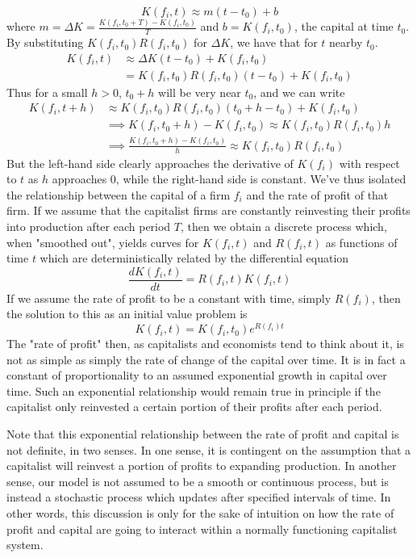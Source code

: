 \documentclass{article}
\theoremstyle{definition}
\theoremstyle{plain}
\theoremstyle{theorem}
\begin{document}
\[ K(f_i,t) \approx m(t-t_0)+b \]
where $m = \Delta K = \frac{K(f_i,t_0+T)-K(f_i,t_0)}{T}$ and $b = K(f_i,t_0)$, the capital at time $t_0$. By substituting $K(f_i,t_0)R(f_i,t_0)$ for $\Delta K$, we have that for $t$ nearby $t_0$.
\begin{align}
 	K(f_i,t) &\approx \Delta K(t-t_0)+K(f_i,t_0) \\
 			&= K(f_i,t_0)R(f_i,t_0)(t-t_0) + K(f_i,t_0)  
\end{align}
Thus for a small $h>0$, $t_0+h$ will be very near $t_0$, and we can write
\begin{align}
	K(f_i,t+h) &\approx K(f_i,t_0)R(f_i,t_0)(t_0+h-t_0) + K(f_i,t_0) \\
	&\implies K(f_i,t_0+h)-K(f_i,t_0) \approx K(f_i,t_0)R(f_i,t_0)h \\
	&\implies \frac{K(f_i,t_0+h)-K(f_i,t_0)}{h} \approx K(f_i,t_0)R(f_i,t_0)
\end{align}
But the left-hand side clearly approaches the derivative of $K(f_i)$ with respect to $t$ as $h$ approaches $0$, while the right-hand side is constant. We've thus isolated the relationship between the capital of a firm $f_i$ and the rate of profit of that firm. If we assume that the capitalist firms are constantly reinvesting their profits into production after each period $T$, then we obtain a discrete process which, when "smoothed out", yields curves for $K(f_i,t)$ and $R(f_i,t)$ as functions of time $t$ which are deterministically related by the differential equation
\[ \frac{dK(f_i,t)}{dt} = R(f_i,t)K(f_i,t) \]
If we assume the rate of profit to be a constant with time, simply $R(f_i)$, then the solution to this as an initial value problem is 
\[ K(f_i,t) = K(f_i,t_0)e^{R(f_i)t} \] 
The "rate of profit" then, as capitalists and economists tend to think about it, is not as simple as simply the rate of change of the capital over time. It is in fact a constant of proportionality to an assumed exponential growth in capital over time. Such an exponential relationship would remain true in principle if the capitalist only reinvested a certain portion of their profits after each period. \par 
Note that this exponential relationship between the rate of profit and capital is not definite, in two senses. In one sense, it is contingent on the assumption that a capitalist will reinvest a portion of profits to expanding production. In another sense, our model is not assumed to be a smooth or continuous process, but is instead a stochastic process which updates after specified intervals of time. In other words, this discussion is only for the sake of intuition on how the rate of profit and capital are going to interact within a normally functioning capitalist system. \par 
\end{document}
